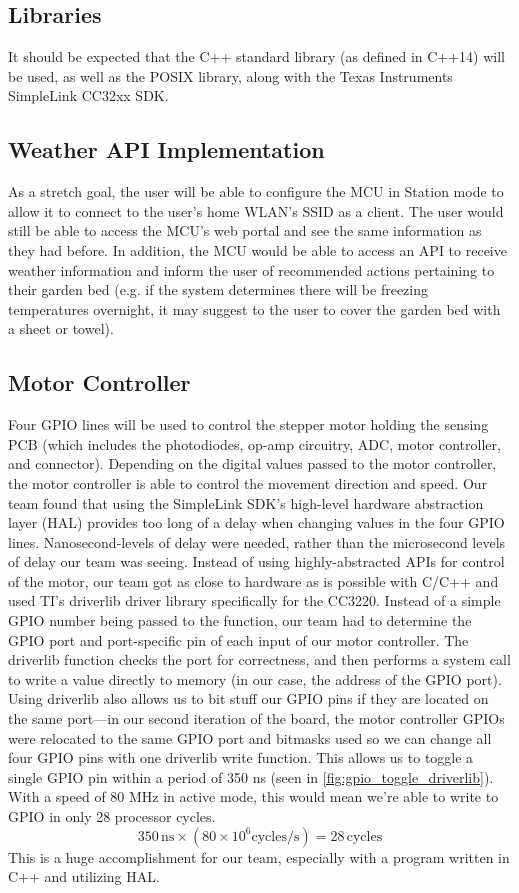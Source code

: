 \documentclass[journal]{IEEEtran}
\begin{document}
\subsection{Libraries}
It should be expected that the C++ standard library (as defined in C++14) will be used, as well as the POSIX library, along with the Texas Instruments SimpleLink CC32xx SDK.

\subsection{Weather API Implementation}
As a stretch goal, the user will be able to configure the MCU in Station mode to allow it to connect to the user's home WLAN's SSID as a client. The user would still be able to access the MCU's web portal and see the same information as they had before. In addition, the MCU would be able to access an API to receive weather information and inform the user of recommended actions pertaining to their garden bed (e.g. if the system determines there will be freezing temperatures overnight, it may suggest to the user to cover the garden bed with a sheet or towel).
\subsection{Motor Controller}
Four GPIO lines will be used to control the stepper motor holding the sensing PCB (which includes the photodiodes, op-amp circuitry, ADC, motor controller, and connector). Depending on the digital values passed to the motor controller, the motor controller is able to control the movement direction and speed. Our team found that using the SimpleLink SDK's high-level hardware abstraction layer (HAL) provides too long of a delay when changing values in the four GPIO lines. Nanosecond-levels of delay were needed, rather than the microsecond levels of delay our team was seeing. Instead of using highly-abstracted APIs for control of the motor, our team got as close to hardware as is possible with C/C++ and used TI's driverlib driver library specifically for the CC3220. Instead of a simple GPIO number being passed to the function, our team had to determine the GPIO port and port-specific pin of each input of our motor controller. The driverlib function checks the port for correctness, and then performs a system call to write a value directly to memory (in our case, the address of the GPIO port). Using driverlib also allows us to bit stuff our GPIO pins if they are located on the same port---in our second iteration of the board, the motor controller GPIOs were relocated to the same GPIO port and bitmasks used so we can change all four GPIO pins with one driverlib write function. This allows us to toggle a single GPIO pin within a period of 350 ns (seen in \ref{fig:gpio_toggle_driverlib}). With a speed of 80 MHz in active mode, this would mean we're able to write to GPIO in only 28 processor cycles.
\begin{equation}
    350\,\mathrm{ns} \times (80\times10^6\mathrm{cycles/s}) = 28\,\mathrm{cycles}
\end{equation}
This is a huge accomplishment for our team, especially with a program written in C++ and utilizing HAL.
\end{document}
